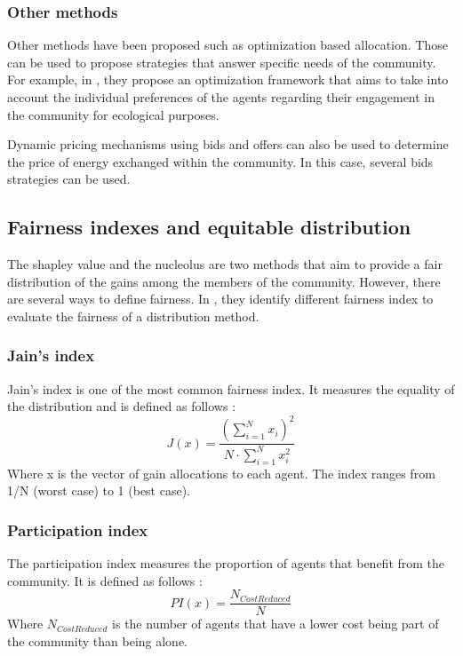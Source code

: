 \documentclass[12pt,a4paper]{article}
\begin{document}
\subsubsection{Other methods}

Other methods have been proposed such as optimization based allocation. Those can be used to propose strategies that answer specific needs of the community. For example, in \cite{these_new}, they propose an optimization framework that aims to take into account the individual preferences of the agents regarding their engagement in the community for ecological purposes.

Dynamic pricing mechanisms using bids and offers can also be used to determine the price of energy exchanged within the community. In this case, several bids strategies can be used.

\subsection{Fairness indexes and equitable distribution}
\label{section-index}

The shapley value and the nucleolus are two methods that aim to provide a fair distribution of the gains among the members of the community. However, there are several ways to define fairness. In \cite{article_1, these_new, article_8, article_2}, they identify different fairness index to evaluate the fairness of a distribution method. %


\subsubsection{Jain's index}
Jain's index \cite{article_1, these_new, article_8, article_2} is one of the most common fairness index. It measures the equality of the distribution and is defined as follows :
\begin{equation}
    J(x) = \frac{(\sum_{i=1}^{N}{x_i})^2}{N \cdot \sum_{i=1}^{N}{x_i^2}} \nonumber
\end{equation}
Where x is the vector of gain allocations to each agent. The index ranges from 1/N (worst case) to 1 (best case).

\subsubsection{Participation index}
The participation index \cite{article_8} measures the proportion of agents that benefit from the community. It is defined as follows :
\begin{equation}
    PI(x) = \frac{N_{CostReduced}}{N} \nonumber
\end{equation}
Where $N_{CostReduced}$ is the number of agents that have a lower cost being part of the community than being alone.
\end{document}

